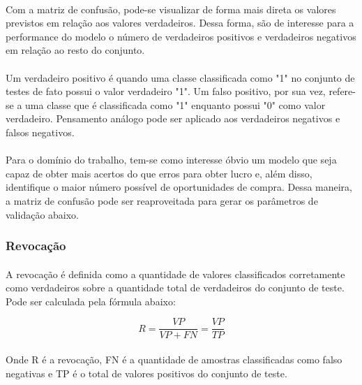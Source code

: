 \documentclass[grad,numbers]{coppe}
\begin{document}
                \paragraph{}Com a matriz de confusão, pode-se visualizar de forma mais direta os valores previstos em relação aos valores verdadeiros. Dessa forma, são de interesse para a performance do modelo o número de verdadeiros positivos e verdadeiros negativos em relação ao resto do conjunto.
                
                \paragraph{}Um verdadeiro positivo é quando uma classe classificada como "1" no conjunto de testes de fato possui o valor verdadeiro "1". Um falso positivo, por sua vez, refere-se a uma classe que é classificada como "1" enquanto possui "0" como valor verdadeiro. Pensamento análogo pode ser aplicado aos verdadeiros negativos e falsos negativos.
                
                \paragraph{}Para o domínio do trabalho, tem-se como interesse óbvio um modelo que seja capaz de obter mais acertos do que erros para obter lucro e, além disso, identifique o maior número possível de oportunidades de compra. Dessa maneira, a matriz de confusão pode ser reaproveitada para gerar os parâmetros de validação abaixo.
                
                \subsubsection{Revocação}
                    \paragraph{}A revocação é definida como a quantidade de valores classificados corretamente como verdadeiros sobre a quantidade total de verdadeiros do conjunto de teste. Pode ser calculada pela fórmula abaixo:
                    
                    \begin{equation}
                        R = \frac{VP}{VP + FN} = \frac{VP}{TP}
                    \end{equation}
                    
                    \paragraph{}Onde R é a revocação, FN é a quantidade de amostras classificadas como falso negativas e TP é o total de valores positivos do conjunto de teste.
                    
\end{document}
